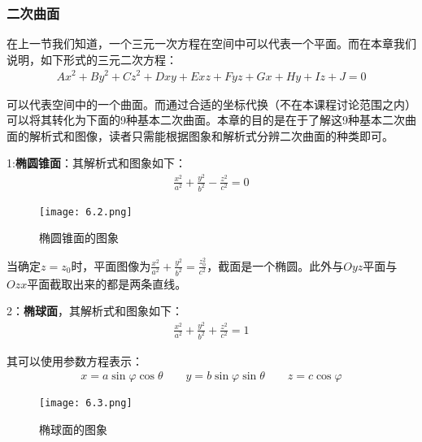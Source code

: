 \documentclass{ctexart}
\let\oldtextbf\textbf %
\renewcommand{\textbf}[1]{\textcolor{btex}{\oldtextbf{#1}}} %
\begin{document}
\subsubsection{二次曲面}
在上一节我们知道，一个三元一次方程在空间中可以代表一个平面。而在本章我们说明，如下形式的三元二次方程：
\begin{align*}
    Ax^2+By^2+Cz^2+Dxy+Exz+Fyz+Gx+Hy+Iz+J=0
\end{align*}

可以代表空间中的一个曲面。而通过合适的坐标代换（不在本课程讨论范围之内）可以将其转化为下面的9种基本二次曲面。本章的目的是在于了解这9种基本二次曲面的解析式和图像，读者只需能根据图象和解析式分辨二次曲面的种类即可。

1:\textbf{椭圆锥面}：其解析式和图象如下：
\begin{align*}
    \frac{x^2}{a^2}+\frac{y^2}{b^2}-\frac{z^2}{c^2}=0\tag{6-15}
\end{align*}
\begin{figure}[H]    
\centering     
\renewcommand{\figurename}{图}     
\renewcommand{\thefigure}{6.2}    
\begin{myimagebox}[width=0.23\textwidth] %
\texttt{[image: 6.2.png]} %
\end{myimagebox}     
\caption{\label{fig:6.2}椭圆锥面的图象}   
\end{figure}

当确定$z=z_0$时，平面图像为$\frac{x^2}{a^2}+\frac{y^2}{b^2}=\frac{z_0^2}{c^2}$，截面是一个椭圆。此外与$Oyz$平面与$Ozx$平面截取出来的都是两条直线。

2：\textbf{椭球面}，其解析式和图象如下：
\begin{align*}
    \frac{x^2}{a^2}+\frac{y^2}{b^2}+\frac{z^2}{c^2}=1\tag{6-16}
\end{align*}

其可以使用参数方程表示：
\begin{align*}
    x=a\sin\varphi\cos\theta\qquad y=b\sin\varphi\sin\theta\qquad z=c\cos\varphi\tag{6-17}
\end{align*}
\begin{figure}[H]    
\centering     
\renewcommand{\figurename}{图}     
\renewcommand{\thefigure}{6.3}    
\begin{myimagebox}[width=0.23\textwidth] %
\texttt{[image: 6.3.png]} %
\end{myimagebox}     
\caption{\label{fig:6.3}椭球面的图象}   
\end{figure}
\end{document}
